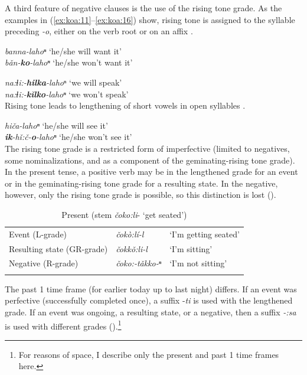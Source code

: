 \documentclass[output=paper,colorlinks,citecolor=brown]{langscibook}
\begin{document}
A third feature of negative clauses is the use of the rising tone grade. As the examples in (\ref{ex:koa:11}--\ref{ex:koa:16}) show, rising tone is assigned to the syllable preceding \textit{-o}, either on the verb root  or on an affix .

\ea\label{ex:koa:17}
\textit{banna-lahoⁿ} \tab ‘he/she will want it’ \\
\textit{bǎn-\textbf{ko}-lahoⁿ} \tab ‘he/she won’t want it’ \\
\z

\ea\label{ex:koa:18}
\textit{na:ɬi:-\textbf{hilka}-laho}ⁿ \tab ‘we will speak’ \\
\textit{na:ɬi:-\textbf{kǐlko}-lahoⁿ} \tab ‘we won’t speak’ \\
\z
Rising tone leads to lengthening of short vowels in open syllables .

\ea\label{ex:koa:19}
\textit{hiča-lahoⁿ} \tab ‘he/she will see it’ \\
\textit{\textbf{ik}-hǐ:č-\textbf{o}-lahoⁿ} \tab ‘he/she won’t see it’ \\
\z
The rising tone grade is a restricted form of imperfective (limited to negatives, some nominalizations, and as a component of the geminating-rising tone grade). In the present tense, a positive verb may be in the lengthened grade for an event or in the geminating-rising tone grade for a resulting state. In the negative, however, only the rising tone grade is possible, so this  distinction is lost ().

\begin{table}
    \centering
    \begin{tabular}{lll} 
\lsptoprule
        Event (L-grade) & \textit{čokò:lí-l} & ‘I’m getting seated’ \\
        Resulting state (GR-grade) & \textit{čokkǒ:li-l} & ‘I’m sitting’ \\
        Negative (R-grade) & \textit{čoko:-tǎkko-ⁿ} & ‘I’m not sitting’ \\ 
\lspbottomrule
    \end{tabular}
    \caption{Present (stem \textit{čoko:li}- ‘get seated’)}
    \label{tab:koa:2}
\end{table}


The past 1 time frame (for earlier today up to last night) differs. If an event was perfective (successfully completed once), a suffix -\textit{ti} is used with the lengthened grade. If an event was ongoing, a resulting state, or a negative, then a suffix \textit{-:sa} is used with different grades ().\footnote{For reasons of space, I describe only the present and past 1 time frames here.}
\end{document}
